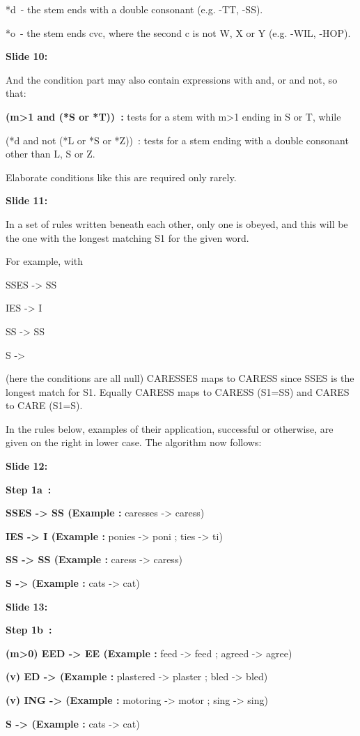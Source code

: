 \documentclass[11pt,a4paper]{article}
\begin{document}
*d - the stem ends with a double consonant (e.g. -TT, -SS).

*o - the stem ends cvc, where the second c is not W, X or Y (e.g. -WIL, -HOP).

\textbf{Slide 10:}

And the condition part may also contain expressions with and, or and not, so that:

\textbf{(m>1 and (*S or *T)) :}  tests for a stem with m>1 ending in S or T, while

(*d and not (*L or *S or *Z)) : tests for a stem ending with a double consonant other than L, S or Z.

Elaborate conditions like this are required only rarely.

\textbf{Slide 11:}

In a set of rules written beneath each other, only one is obeyed, and this will be the one with the longest matching S1 for the given word.

For example, with

SSES -> SS

IES -> I

SS -> SS

S ->

(here the conditions are all null) CARESSES maps to CARESS since SSES is the longest match for S1. Equally CARESS maps to CARESS (S1=SS) and CARES to CARE (S1=S).

In the rules below, examples of their application, successful or otherwise, are given on the right in lower case. The algorithm now follows:

\textbf{Slide 12:}

\textbf{Step 1a :} 

\textbf{SSES -> SS (Example :}  caresses -> caress)

\textbf{IES -> I (Example :}  ponies -> poni ; ties -> ti)

\textbf{SS -> SS (Example :}  caress -> caress)

\textbf{S -> (Example :}  cats -> cat)

\textbf{Slide 13:}

\textbf{Step 1b :} 

\textbf{(m>0) EED -> EE (Example :}  feed -> feed ; agreed -> agree)

\textbf{(v) ED -> (Example :}  plastered -> plaster ; bled -> bled)

\textbf{(v) ING -> (Example :}  motoring -> motor ; sing -> sing)

\textbf{S -> (Example :}  cats -> cat)
\end{document}
